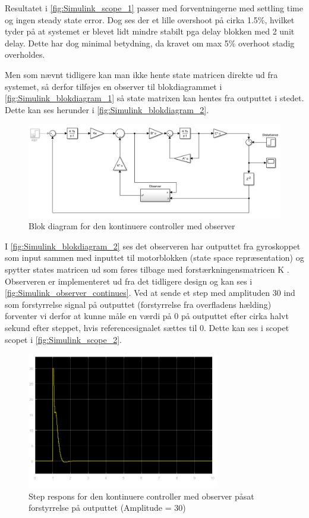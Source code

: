 Resultatet i \autoref{fig:Simulink_scope_1} passer med forventningerne med settling time og ingen steady state error. Dog ses der et lille overshoot på cirka 1.5\%, hvilket tyder på at systemet er blevet lidt mindre stabilt pga delay blokken med 2 unit delay. Dette har dog minimal betydning, da kravet om max 5\% overhoot stadig overholdes.

Men som nævnt tidligere kan man ikke hente state matricen direkte ud fra systemet, så derfor tilføjes en observer til blokdiagrammet i \autoref{fig:Simulink_blokdiagram_1} så state matrixen kan hentes fra outputtet i stedet. Dette kan ses herunder i \autoref{fig:Simulink_blokdiagram_2}.

\begin{figure}[H]
	\centering
	\includegraphics[width = 1\textwidth]{figur/Simulink_blokdiagram_2}
	\caption{Blok diagram for den kontinuere controller med observer}
	\label{fig:Simulink_blokdiagram_2}
\end{figure}
I \autoref{fig:Simulink_blokdiagram_2} ses det observeren har outputtet fra gyroskoppet som input sammen med inputtet til motorblokken (state space repræsentation) og spytter states matricen ud som føres tilbage med forstærkningensmatricen K . Observeren er implementeret ud fra det tidligere design og kan ses i \autoref{fig:Simulink_observer_continues}. Ved at sende et step med amplituden 30 ind som forstyrrelse signal på outputtet (forstyrrelse fra overfladens hælding) forventer vi derfor at kunne måle en værdi på 0 på outputtet efter cirka halvt sekund efter steppet, hvis referencesignalet sættes til 0. Dette kan ses i scopet scopet i \autoref{fig:Simulink_scope_2}.
 
\begin{figure}[H]
	\centering
	\includegraphics[width = 0.75\textwidth]{figur/Simulink_scope_2}
	\caption{Step respons for den kontinuere controller med observer påsat forstyrrelse på outputtet (Amplitude = 30)}
	\label{fig:Simulink_scope_2}
\end{figure}

